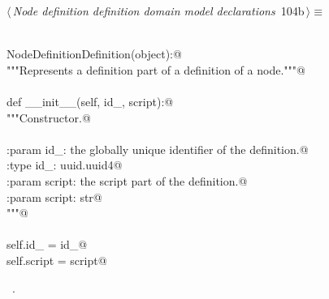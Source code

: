 \documentclass[
    a4paper,      %
    10pt,         %
    openright,    %
    notitlepage,  %
    parskip=half, %
]{scrreprt}       %
\theoremstyle{definition}                    %
\begin{document}
\begin{flushleft} \small
\begin{minipage}{\linewidth}\label{scrap170}\raggedright\small
{} $\langle\,${\itshape Node definition definition domain model declarations}\nobreak\ {\footnotesize {104b}}$\,\rangle\equiv$
\vspace{-1exm}
\begin{list}{}{} \item
\mbox{}\lstinline@@\\
\mbox{}\lstinline@class NodeDefinitionDefinition(object):@\\
\mbox{}\lstinline@    """Represents a definition part of a definition of a node."""@\\
\mbox{}\lstinline@@\\
\mbox{}\lstinline@    def __init__(self, id_, script):@\\
\mbox{}\lstinline@        """Constructor.@\\
\mbox{}\lstinline@@\\
\mbox{}\lstinline@        :param id_: the globally unique identifier of the definition.@\\
\mbox{}\lstinline@        :type  id_: uuid.uuid4@\\
\mbox{}\lstinline@        :param script: the script part of the definition.@\\
\mbox{}\lstinline@        :param script: str@\\
\mbox{}\lstinline@        """@\\
\mbox{}\lstinline@@\\
\mbox{}\lstinline@        self.id_ = id_@\\
\mbox{}\lstinline@        self.script = script@{\NWsep}
\end{list}
\vspace{-1.5ex}
\footnotesize
\begin{list}{}{\setlength{\itemsep}{-\parsep}\setlength{\itemindent}{-\leftmargin}}
\item \NWtxtMacroRefIn\ .

\item{}
\end{list}
\end{minipage}\vspace{4ex}
\end{flushleft}
\end{document}
